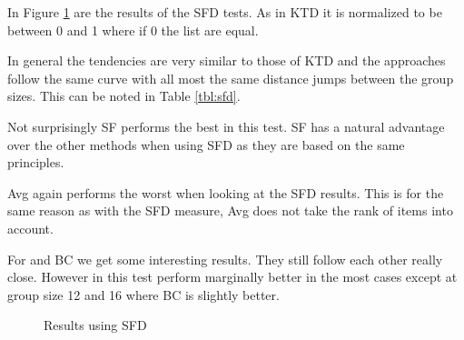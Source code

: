 In Figure \ref{fig:footruledistance} are the results of the SFD tests. As in KTD it is normalized to be between 0 and 1 where if 0 the list are equal.

In general the tendencies are very similar to those of KTD and the approaches follow the same curve with all most the same distance jumps between the group sizes. This can be noted in Table \ref{tbl:sfd}.

Not surprisingly SF performs the best in this test. SF has a natural advantage over the other methods when using SFD as they are based on the same principles.

Avg again performs the worst when looking at the SFD results. This is for the same reason as with the SFD measure, Avg does not take the rank of items into account.

For \MC and BC we get some interesting results. They still follow each other really close. However in this test \MC perform marginally better in the most cases except at group size 12 and 16 where BC is slightly better.

\begin{figure}[H]
\caption{Results using SFD} \label{fig:footruledistance}
\end{figure}

